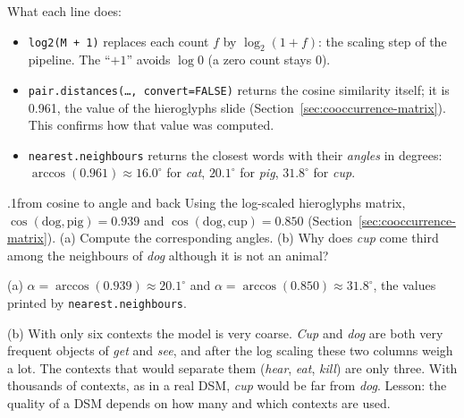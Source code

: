 What each line does:
\begin{itemize}[nosep]
  \item \texttt{log2(M + 1)} replaces each count $f$ by $\log_2(1+f)$: the scaling step
        of the pipeline. The ``$+1$'' avoids $\log 0$ (a zero count stays 0).
  \item \texttt{pair.distances(\ldots, convert=FALSE)} returns the cosine similarity
        itself; it is 0.961, the value of the hieroglyphs slide
        (Section~\ref{sec:cooccurrence-matrix}). This confirms how that value was
        computed.
  \item \texttt{nearest.neighbours} returns the closest words with their
        \emph{angles} in degrees: $\arccos(0.961) \approx 16.0^\circ$ for \emph{cat},
        $20.1^\circ$ for \emph{pig}, $31.8^\circ$ for \emph{cup}.
\end{itemize}

\begin{nbexercise}{\thesubsection.1}{from cosine to angle and back}
Using the log-scaled hieroglyphs matrix, $\cos(\text{dog}, \text{pig}) = 0.939$ and
$\cos(\text{dog}, \text{cup}) = 0.850$ (Section~\ref{sec:cooccurrence-matrix}).
(a) Compute the corresponding angles. (b) Why does \emph{cup} come third among the
neighbours of \emph{dog} although it is not an animal?
\end{nbexercise}
\begin{nbsolution}
(a) $\alpha = \arccos(0.939) \approx 20.1^\circ$ and $\alpha = \arccos(0.850) \approx
31.8^\circ$, the values printed by \texttt{nearest.neighbours}.

(b) With only six contexts the model is very coarse. \emph{Cup} and \emph{dog} are both
very frequent objects of \emph{get} and \emph{see}, and after the log scaling these two
columns weigh a lot. The contexts that would separate them (\emph{hear}, \emph{eat},
\emph{kill}) are only three. With thousands of contexts, as in a real DSM, \emph{cup}
would be far from \emph{dog}. Lesson: the quality of a DSM depends on how many and which
contexts are used.
\end{nbsolution}

